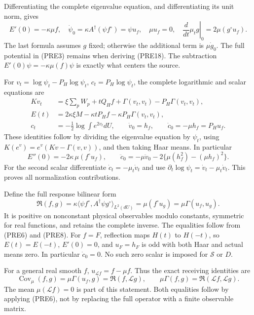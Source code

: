 \documentclass[11pt]{article}
\begin{document}
Differentiating the complete eigenvalue equation, and differentiating its unit norm, gives
\[
 E'(0)=-\kappa\mu f,\quad
 \dot\psi_0=\kappa A^\dagger(\psi f^\circ)=\psi u_f,\quad
 \mu u_f=0,\quad
 \left.\frac d{dt}\mu_t g\right|_0
       =2\mu(g^\circ u_f).
 \tag{PRE18}
\]
The last formula assumes \(g\) fixed; otherwise the additional term is \(\mu\dot g_0\). The full potential in (PRE3) remains when deriving (PRE18). The subtraction \(E'(0)\psi=-\kappa\mu(f)\psi\) is exactly what centers the source.

For \(v_t=\log\psi_t-P_H\log\psi_t\), \(c_t=P_H\log\psi_t\), the complete logarithmic and scalar equations are
\[
 \begin{aligned}
 Kv_t&=\xi\sum_pW_p+tQ_Hf+\Gamma(v_t,v_t)-P_H\Gamma(v_t,v_t),\\
 E(t)&=2\kappa\xi M-\kappa tP_Hf
                         -\kappa P_H\Gamma(v_t,v_t),\\
 c_t&=-\tfrac12\log\int e^{2v_t}dU,\qquad
 \dot v_0=h_f,\qquad \dot c_0=-\mu h_f=P_Hu_f.
 \end{aligned}\tag{PRE19}
\]
These identities follow by dividing the eigenvalue equation by \(\psi_t\), using \(K(e^v)=e^v(Kv-\Gamma(v,v))\), and then taking Haar means. In particular
\[
 E''(0)=-2\kappa\,\mu(f^\circ u_f),\qquad
 \ddot c_0=-\mu\ddot v_0
      -2\{\mu(h_f^2)-(\mu h_f)^2\}.
 \tag{PRE20}
\]
For the second scalar differentiate \(\dot c_t=-\mu_t\dot v_t\) and use \(\partial_t\log\psi_t=\dot v_t-\mu_t\dot v_t\). This proves all normalization contributions.

Define the full response bilinear form
\[
 \mathfrak R(f,g)
  =\kappa\langle \psi f^\circ,A^\dagger\psi g^\circ\rangle_{L^2(dU)}
  =\mu(f^\circ u_g)=\mu\Gamma(u_f,u_g).
 \tag{PRE21}
\]
It is positive on nonconstant physical observables modulo constants, symmetric for real functions, and retains the complete inverse. The equalities follow from (PRE6) and (PRE8). For \(f=F\), reflection maps \(H(t)\) to \(H(-t)\), so \(E(t)=E(-t)\), \(E'(0)=0\), and \(u_F=h_F\) is odd with both Haar and actual means zero. In particular \(\dot c_0=0\). No such zero scalar is imposed for \(\mathcal S\) or \(D\).

For a general real smooth \(f\), \(u_{\mathcal L f}=f-\mu f\). Thus the exact receiving identities are
\[
 \operatorname{Cov}_\mu(f,g)
       =\mu\Gamma(u_f,g)=\mathfrak R(f,\mathcal Lg),\qquad
 \mu\Gamma(f,g)=\mathfrak R(\mathcal Lf,\mathcal Lg).
 \tag{PRE22}
\]
The mean \(\mu(\mathcal Lf)=0\) is part of this statement. Both equalities follow by applying (PRE6), not by replacing the full operator with a finite observable matrix.
\end{document}
